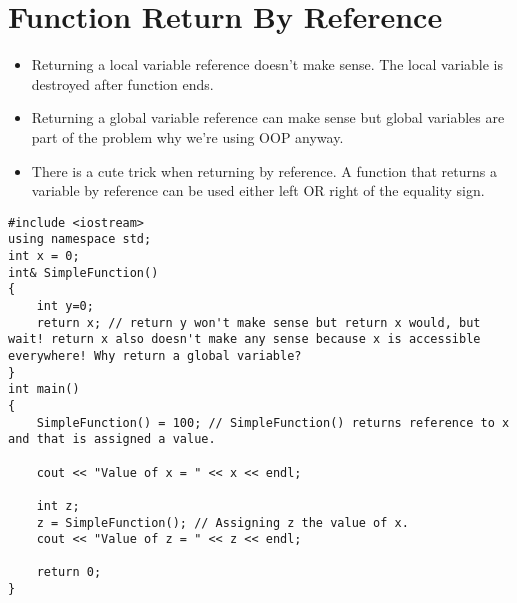 \documentclass[12pt,a4paper]{article}
\begin{document}
\section{Function Return By Reference}
\begin{itemize}
\item Returning a local variable reference doesn't make sense. The local variable is destroyed after function ends.
\item Returning a global variable reference can make sense but global variables are part of the problem why we're using OOP anyway.
\item There is a cute trick when returning by reference. A function that returns a variable by reference can be used either left OR right of the equality sign.
\end{itemize}
\begin{lstlisting}[caption={Function Returning Reference}]
#include <iostream>
using namespace std;
int x = 0;
int& SimpleFunction()
{
	int y=0;
	return x; // return y won't make sense but return x would, but wait! return x also doesn't make any sense because x is accessible everywhere! Why return a global variable?
}
int main()
{
	SimpleFunction() = 100; // SimpleFunction() returns reference to x and that is assigned a value.

	cout << "Value of x = " << x << endl;
	
	int z;
	z = SimpleFunction(); // Assigning z the value of x.
	cout << "Value of z = " << z << endl;

	return 0;
}
\end{lstlisting}
\end{document}
